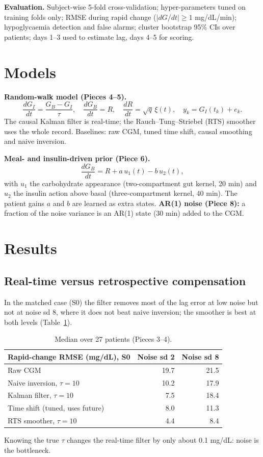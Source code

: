 \documentclass[11pt,a4paper]{article}
\begin{document}
\textbf{Evaluation.} Subject-wise 5-fold cross-validation; hyper-parameters tuned on training folds only; RMSE during rapid change ($|dG/dt|\ge 1$ mg/dL/min); hypoglycaemia detection and false alarms; cluster bootstrap 95\% CIs over patients; days 1--3 used to estimate lag, days 4--5 for scoring.

\section{Models}
\textbf{Random-walk model (Pieces 4--5).}
$$\frac{dG_I}{dt}=\frac{G_B-G_I}{\tau},\quad \frac{dG_B}{dt}=R,\quad \frac{dR}{dt}=\sqrt{q}\,\xi(t),\quad y_k=G_I(t_k)+e_k .$$
The causal Kalman filter is real-time; the Rauch--Tung--Striebel (RTS) smoother uses the whole record. Baselines: raw CGM, tuned time shift, causal smoothing and naive inversion.

\textbf{Meal- and insulin-driven prior (Piece 6).}
$$\frac{dG_B}{dt}=R+a\,u_1(t)-b\,u_2(t),$$
with $u_1$ the carbohydrate appearance (two-compartment gut kernel, 20 min) and $u_2$ the insulin action above basal (three-compartment kernel, 40 min). The patient gains $a$ and $b$ are learned as extra states. \textbf{AR(1) noise (Piece 8):} a fraction of the noise variance is an AR(1) state (30 min) added to the CGM.

\section{Results}
\subsection*{Real-time versus retrospective compensation}
In the matched case (S0) the filter removes most of the lag error at low noise but not at noise sd 8, where it does not beat naive inversion; the smoother is best at both levels (Table~\ref{tab:main}).
\begin{table}[h]\centering\small
\begin{tabular}{lrr}\toprule
Rapid-change RMSE (mg/dL), S0 & Noise sd 2 & Noise sd 8\\\midrule
Raw CGM & 19.7 & 21.5\\ Naive inversion, $\tau=10$ & 10.2 & 17.9\\ Kalman filter, $\tau=10$ & 7.5 & 18.4\\ Time shift (tuned, uses future) & 8.0 & 11.3\\ RTS smoother, $\tau=10$ & 4.4 & 8.4\\\bottomrule
\end{tabular}\caption{Median over 27 patients (Pieces 3--4).}\label{tab:main}
\end{table}
Knowing the true $\tau$ changes the real-time filter by only about 0.1 mg/dL: noise is the bottleneck.
\end{document}
